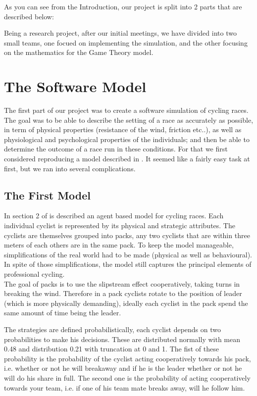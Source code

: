 \documentclass[10pt, a4paper]{report}
\begin{document}
As you can see from the Introduction, our project is split into 2 parts that are described below:

Being a research project, after our initial meetings, we have divided into two small teams, one focued on implementing the simulation, and the other focusing on the mathematics for the Game Theory model.


\section{The Software Model}\label{sec:softmodel}

The first part of our project was to create a software simulation of cycling races. The goal was to be able to describe the setting of a race as accurately as possible, in term of physical properties (resistance of the wind, friction etc..), as well as physiological and psychological properties of the individuals; and then be able to determine the outcome of a race run in these conditions. For that we first considered reproducing a model described in \cite{AgentModel}. It seemed like a fairly easy task at first, but we ran into several complications.

\subsection{The First Model}\label{subsec:model1}

In section 2 of \cite{AgentModel} is described an agent based model for cycling races. Each individual cyclist is represented by its physical and strategic attributes. The cyclists are themselves grouped into packs, any two cyclists that are within three meters of each others are in the same pack. To keep the model manageable, simplifications of the real world had to be made (physical as well as behavioural). In spite of those simplifications, the model still captures the principal elements of professional cycling. \\

The goal of packs is to use the slipstream effect cooperatively, taking turns in breaking the wind. Therefore in a pack cyclists rotate to the position of leader (which is more physically demanding), ideally each cyclist in the pack spend the same amount of time being the leader.

The strategies are defined probabilistically, each cyclist depends on two probabilities to make his decisions. These are distributed normally with mean 0.48 and distribution 0.21 with truncation at 0 and 1. The fist of these probability is the probability of the cyclist acting cooperatively towards his pack, i.e. whether or not he will breakaway and if he is the leader whether or not he will do his share in full. The second one is the probability of acting cooperatively towards your team, i.e. if one of his team mate breaks away, will he follow him. \\
\end{document}
